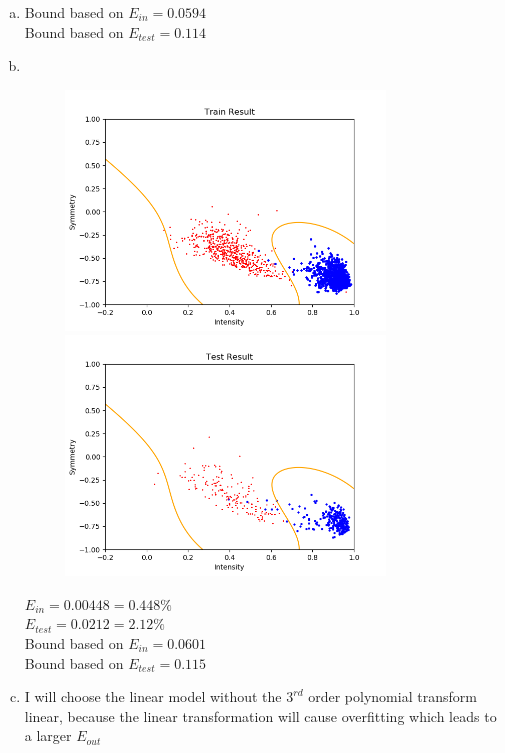 \documentclass[11pt]{article}
\begin{document}
\begin{enumerate} [(a)]
	\item Bound based on $E_{in} = 0.0594$\\
	Bound based on $E_{test} = 0.114$
	\newpage
	\item \
	\begin{figure}[htbp]
		\centering
		\begin{minipage}[t]{0.48\textwidth}
			\centering
			\includegraphics[width=8.5cm]{train_result1.png}
		\end{minipage}
		\begin{minipage}[t]{0.48\textwidth}
			\centering
			\includegraphics[width=8.5cm]{test_result1.png}
		\end{minipage}
	\end{figure}
	$E_{in} = 0.00448 = 0.448\%$\\$E_{test} = 0.0212=2.12\%$\\
	Bound based on $E_{in} = 0.0601$\\
	Bound based on $E_{test} = 0.115$

	\item I will choose the linear model without the $3^{rd}$ order polynomial transform linear, because the linear transformation will cause overfitting which leads to a larger $E_{out}$
\end{enumerate}
\newpage
\end{document}
